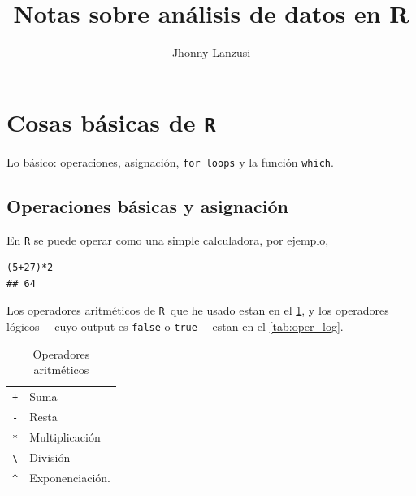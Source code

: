 \documentclass[fleqn,leqno,draft,10pt]{article}
\title{Notas sobre análisis de datos en R}
\author{Jhonny Lanzusi}
\newcommand{\R}{\texttt{R}}
\begin{document}
\maketitle
\tableofcontents
{}

\section{Cosas básicas de \R}

Lo básico: operaciones, asignación, \lstinline|for loops| y la función \lstinline|which|. 

\subsection{Operaciones básicas y asignación}%
\label{sub:operaciones_básicas_y_asignación}

En \R{} se puede operar como una simple calculadora, por ejemplo,%

\begin{lstlisting}
(5+27)*2
## 64
\end{lstlisting}

Los operadores aritméticos de \R\ que he usado estan en el \cref{tab:oper_arit}, y los operadores lógicos ---cuyo output es \lstinline|false| o \lstinline|true|--- estan en el \cref{tab:oper_log}.

\begin{table}\caption{Operadores aritméticos}\label{tab:oper_arit}
\begin{tabular}{rl}
	\toprule
	\texttt{+} & Suma \\
	\lstinline|-| & Resta \\
	\lstinline|*| & Multiplicación \\ 
	\lstinline|\| & División \\
	\lstinline|^| & Exponenciación. \\
	\bottomrule
\end{tabular}
\end{table}
\end{document}
